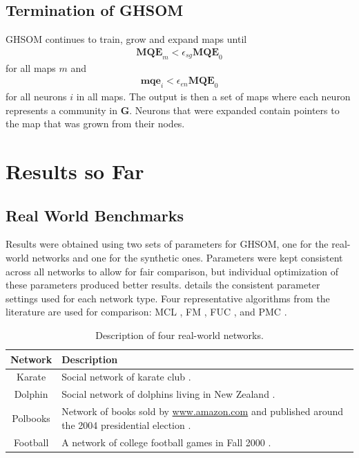 \documentclass{report}
\begin{document}
	\section{Termination of GHSOM}
	GHSOM continues to train, grow and expand maps until 
	\begin{align}
	\textbf{MQE}_m < \epsilon_{sg} \textbf{MQE}_0
	\end{align}
	for all maps $m$ and
	\begin{align}
	\textbf{mqe}_i < \epsilon_{en} \textbf{MQE}_0
	\end{align}
	for all neurons $i$ in all maps. 
	The output is then a set of maps where each neuron represents a community in $\textbf{G}$.
	Neurons that were expanded contain pointers to the map that was grown from their nodes.
	
	\chapter{Results so Far}
	
	\section{Real World Benchmarks}
	
	Results were obtained using two sets of parameters for GHSOM, one for the real-world networks and one for the synthetic ones. Parameters were kept consistent across all networks to allow for fair comparison, but individual optimization of these parameters produced better results.  details the consistent parameter settings used for each network type. Four representative algorithms from the literature are used for comparison: MCL \cite{van2001graph}, FM \cite{clauset2004finding}, FUC \cite{blondel2008fast}, and PMC \cite{yang2013hierarchical}.
	
	\begin{table}
		\centering
		\begin{tabular}{c p{6.5cm}}
			\toprule
			\textbf{Network} & \textbf{Description} \\
			\bottomrule
			Karate & Social network of karate club \cite{zachary1977information}.\\
			Dolphin & Social network of dolphins living in New Zealand \cite{lusseau2003bottlenose}.\\
			Polbooks & Network of books sold by \url{www.amazon.com} and published around the 2004 presidential election \cite{girvan2002community}.\\
			Football & A network of college football games in Fall 2000 \cite{girvan2002community}.\\
			\bottomrule
		\end{tabular}
		\caption{Description of four real-world networks.}
	\end{table}
	
\end{document}
